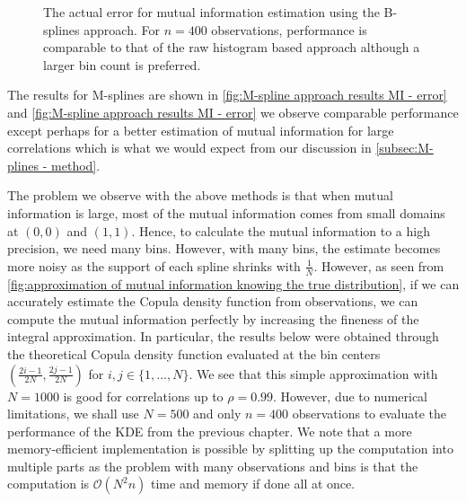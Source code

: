 \documentclass[../Thesis.tex]{subfiles}
\begin{document}
\begin{figure}[H]
\begin{subfigure}[t]{0.4\textwidth}
        \caption{}
    \end{subfigure}
    \caption{The actual error for mutual information estimation using the B-splines approach. For $n=400$ observations, performance is comparable to that of the raw histogram based approach although a larger bin count is preferred.}
    \label{fig:B-spline approach results MI - error}
\end{figure}
The results for M-splines are shown in \autoref{fig:M-spline approach results MI - error} and \autoref{fig:M-spline approach results MI - error} we observe comparable performance except perhaps for a better estimation of mutual information for large correlations which is what we would expect from our discussion in \autoref{subsec:M-plines - method}.

The problem we observe with the above methods is that when mutual information is large, most of the mutual information comes from small domains at $(0,0)$ and $(1,1)$. Hence, to calculate the mutual information to a high precision, we need many bins. However, with many bins, the estimate becomes more noisy as the support of each spline shrinks with $\frac{1}{N}$. However, as seen from \autoref{fig:approximation of mutual information knowing the true distribution}, if we can accurately estimate the Copula density function from observations, we can compute the mutual information perfectly by increasing the fineness of the integral approximation. In particular, the results below were obtained through the theoretical Copula density function evaluated at the bin centers $\left(\frac{2i - 1}{2N}, \frac{2j - 1}{2N}\right)$ for $i,j \in \{1,\dots, N\}$. We see that this simple approximation with $N = 1000$ is good for correlations up to $\rho = 0.99$. However, due to numerical limitations, we shall use $N = 500$ and only $n = 400$ observations to evaluate the performance of the KDE from the previous chapter. We note that a more memory-efficient implementation is possible by splitting up the computation into multiple parts as the problem with many observations and bins is that the computation is $\mathcal{O}\left(N^2n\right)$ time and memory if done all at once.
\end{document}
